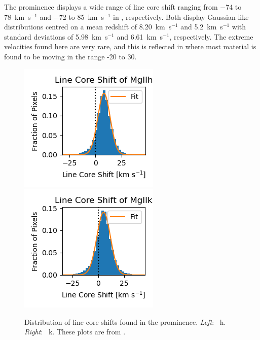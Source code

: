 The prominence displays a wide range of line core shift ranging from $-$74 to 78~km~s$^{-1}$ and $-$72 to 85~km~s$^{-1}$ in \mgiihk, respectively. Both display Gaussian-like distributions centred on a mean redshift of 8.20~km~s$^{-1}$ and 5.2~km~s$^{-1}$ with standard deviations of 5.98~km~s$^{-1}$ and 6.61~km~s$^{-1}$, respectively. The extreme velocities found here are very rare, and this is reflected in  where most material is found to be moving in the range -20\kms{} to 30\kms.  
\begin{figure}
    \centering
    \includegraphics[width=0.35\linewidth]{./02Modelling1D/figs/20180419/hvelocities.png}
    \includegraphics[width=0.35\linewidth]{./02Modelling1D/figs/20180419/kvelocities.png}
    \caption[Distribution of line core shifts found in the prominence.]{Distribution of line core shifts found in the prominence. \textit{Left}: \mgii~h. \textit{Right}: \mgii~k. These plots are from \cite{peat_solar_2021}.}
    \label{fig:velgauss}
\end{figure}
